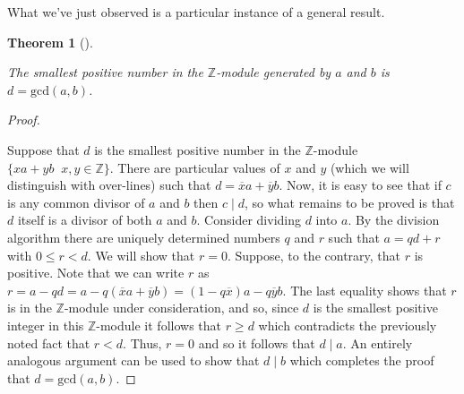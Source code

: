 \documentclass[10pt,]{book}
\theoremstyle{plain}
\newtheorem{theorem}{Theorem}[section]
\theoremstyle{definition}
\theoremstyle{definition}
\numberwithin{equation}{section}
\newcommand{\suchthat}{\;  \;}
\newcommand{\divides}{\!\mid\!}
\renewcommand{\gcd}[2]{\mbox{gcd} (#1, #2)}
\newcommand{\Integers}{{\mathbb Z}}
\newcommand{\lt}{ < }
\begin{document}
    What we've just observed is a particular instance of a general result.
\begin{theorem}[{}]\label{gcduniqueexists}

        The smallest positive number in the \(\Integers\)-module generated by
        \(a\) and \(b\) is \(d = \gcd{a}{b}\).
\end{theorem}
\begin{proof}\hypertarget{proof-21}{}

      Suppose that \(d\) is the smallest positive number
      in the \(\Integers\)-module \(\{ xa + yb \suchthat x,y \in \Integers \}\).
      There are particular values of \(x\) and \(y\) (which we will distinguish
      with over-lines) such that \(d = \overline{x}a + \overline{y}b\). Now, it
      is easy to see that if \(c\) is any common divisor of \(a\) and \(b\) then
      \(c \divides d\), so what remains to be proved is that \(d\) itself is a divisor
      of both \(a\) and \(b\). Consider dividing \(d\) into \(a\). By the
      division algorithm there are uniquely determined numbers \(q\) and \(r\)
      such that \(a =qd + r\) with \(0 \leq r \lt  d\). We will show that \(r=0\).
      Suppose, to the contrary, that \(r\) is positive. Note that we can
      write \(r\) as \(r = a - qd = a - q(\overline{x}a + \overline{y}b) = (1-q\overline{x})a - q\overline{y}b\). The last equality shows that \(r\) is in the
      \(\Integers\)-module under consideration, and so, since \(d\) is the smallest
      positive integer in this \(\Integers\)-module it follows that \(r \geq d\) which
      contradicts the previously noted fact that \(r \lt  d\). Thus, \(r=0\) and so
      it follows that \(d \divides a\). An entirely analogous argument can be used
      to show that \(d \divides b\) which completes the proof that \(d = \gcd{a}{b}\).
\end{proof}
\typeout{************************************************}
\typeout{************************************************}
\end{document}
